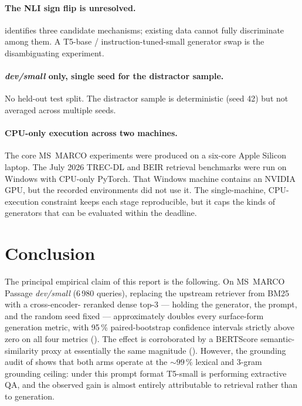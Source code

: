 \documentclass[11pt,a4paper]{article}
\newcommand{\devsmall}{\textit{dev/small}}
\newcommand{\fdev}{6\,980}
\newcommand{\msmarco}{MS~MARCO}
\newcommand{\bertscore}{BERTScore}
\newcommand{\bmtwofive}{BM25}
\begin{document}
\paragraph{The NLI sign flip is unresolved.}
 identifies three candidate
mechanisms; existing data cannot fully discriminate among them.
A T5-base / instruction-tuned-small generator swap is the
disambiguating experiment.

\paragraph{\devsmall{} only, single seed for the distractor sample.}
No held-out test split.  The distractor sample is deterministic
(seed 42) but not averaged across multiple seeds.

\paragraph{CPU-only execution across two machines.}  The core MS~MARCO
experiments were produced on a six-core Apple Silicon laptop.  The
July 2026 TREC-DL and BEIR retrieval benchmarks were run on Windows
with CPU-only PyTorch.  That Windows machine contains an NVIDIA GPU,
but the recorded environments did not use it.  The single-machine,
CPU-execution constraint keeps each stage reproducible, but it caps the
kinds of generators that can be evaluated within the deadline.

\clearpage\section{Conclusion}
\label{sec:conclusion}

The principal empirical claim of this report is the following.
On \msmarco{} Passage \devsmall{} (\fdev{} queries), replacing
the upstream retriever from \bmtwofive{} with a cross-encoder-
reranked dense top-3 --- holding the generator, the prompt, and
the random seed fixed --- approximately doubles every
surface-form generation metric, with 95\,\% paired-bootstrap
confidence intervals strictly above zero on all four metrics
().  The effect is corroborated by a
\bertscore{} semantic-similarity proxy at essentially the same
magnitude ().  However, the grounding
audit of  shows that both arms operate at the
$\sim\!99\,\%$ lexical and 3-gram grounding ceiling: under this
prompt format T5-small is performing extractive QA, and the
observed gain is almost entirely attributable to retrieval
rather than to generation.
\end{document}
